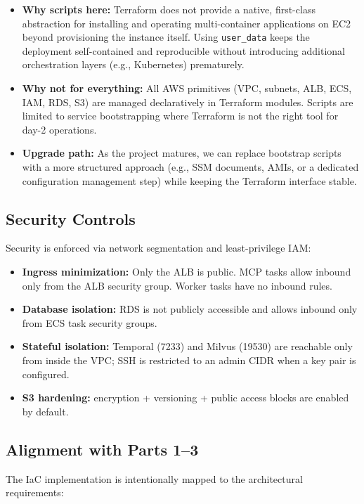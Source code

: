 \documentclass[a4paper,12pt]{article}
\begin{document}
\begin{itemize}[leftmargin=*]
    \item \textbf{Why scripts here:} Terraform does not provide a native, first-class abstraction for installing and operating multi-container applications on EC2 beyond provisioning the instance itself. Using \texttt{user\_data} keeps the deployment self-contained and reproducible without introducing additional orchestration layers (e.g., Kubernetes) prematurely.
    \item \textbf{Why not for everything:} All AWS primitives (VPC, subnets, ALB, ECS, IAM, RDS, S3) are managed declaratively in Terraform modules. Scripts are limited to service bootstrapping where Terraform is not the right tool for day-2 operations.
    \item \textbf{Upgrade path:} As the project matures, we can replace bootstrap scripts with a more structured approach (e.g., SSM documents, AMIs, or a dedicated configuration management step) while keeping the Terraform interface stable.
\end{itemize}

\subsection{Security Controls}
Security is enforced via network segmentation and least-privilege IAM:

\begin{itemize}[leftmargin=*]
    \item \textbf{Ingress minimization:} Only the ALB is public. MCP tasks allow inbound only from the ALB security group. Worker tasks have no inbound rules.
    \item \textbf{Database isolation:} RDS is not publicly accessible and allows inbound only from ECS task security groups.
    \item \textbf{Stateful isolation:} Temporal (7233) and Milvus (19530) are reachable only from inside the VPC; SSH is restricted to an admin CIDR when a key pair is configured.
    \item \textbf{S3 hardening:} encryption + versioning + public access blocks are enabled by default.
\end{itemize}

\subsection{Alignment with Parts 1--3}
The IaC implementation is intentionally mapped to the architectural requirements:
\end{document}
